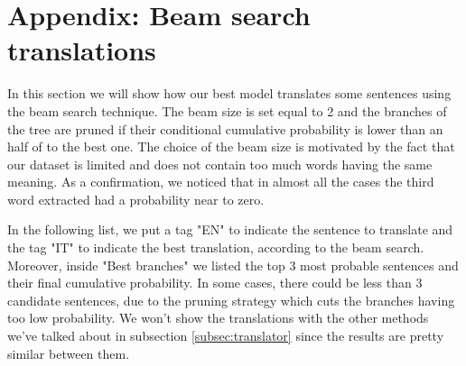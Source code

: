 \section{Appendix: Beam search translations}\label{app:beam_search}
In this section we will show how our best model translates some sentences using the beam search technique. The beam size is set equal to 2 and the branches of the tree are pruned if their conditional cumulative probability is lower than an half of to the best one. The choice of the beam size is motivated by the fact that our dataset is limited and does not contain too much words having the same meaning. As a confirmation, we noticed that in almost all the cases the third word extracted had a probability near to zero.
\vspace{3mm}

In the following list, we put a tag "EN" to indicate the sentence to translate and the tag "IT" to indicate the best translation, according to the beam search. Moreover, inside "Best branches" we listed the top 3 most probable sentences and their final cumulative probability. In some cases, there could be less than 3 candidate sentences, due to the pruning strategy which cuts the branches having too low probability. We won't show the translations with the other methods we've talked about in subsection \ref{subsec:translator} since the results are pretty similar between them.

